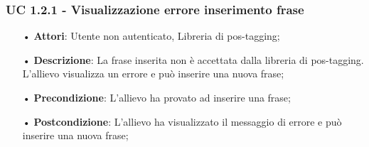 \subsubsection{UC 1.2.1 - Visualizzazione errore inserimento frase}
\begin{itemize}
\item[•]\textbf{Attori}: Utente non autenticato, Libreria di pos-tagging;
\item[•]\textbf{Descrizione}: La frase inserita non è accettata dalla libreria di pos-tagging. L'allievo visualizza un errore e può inserire una nuova frase;
\item[•]\textbf{Precondizione}: L’allievo ha provato ad inserire una frase;
\item[•]\textbf{Postcondizione}: L’allievo ha visualizzato il messaggio di errore e può inserire una nuova frase;
\end{itemize}

